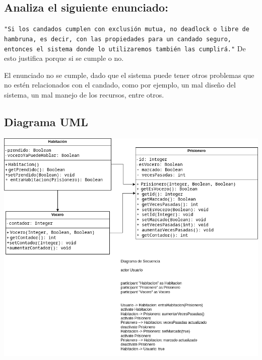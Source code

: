 \documentclass{article}
\begin{document}
\subsection{Analiza el siguiente enunciado:}
\texttt{"Si los candados cumplen con exclusión mutua, no deadlock o libre de hambruna, es decir, con las propiedades para un candado seguro, entonces el sistema donde lo utilizaremos también las cumplirá."} De esto justifica porque si se cumple o no.

El enunciado no se cumple, dado que el sistema puede tener otros problemas que no estén relacionados con el candado, como por ejemplo, un mal diseño del sistema, un mal manejo de los recursos, entre otros.

\subsection{Diagrama UML}
\begin{center}
        \includegraphics[width=1\linewidth]{Practica3.drawio.png}
\end{center}
\end{document}
